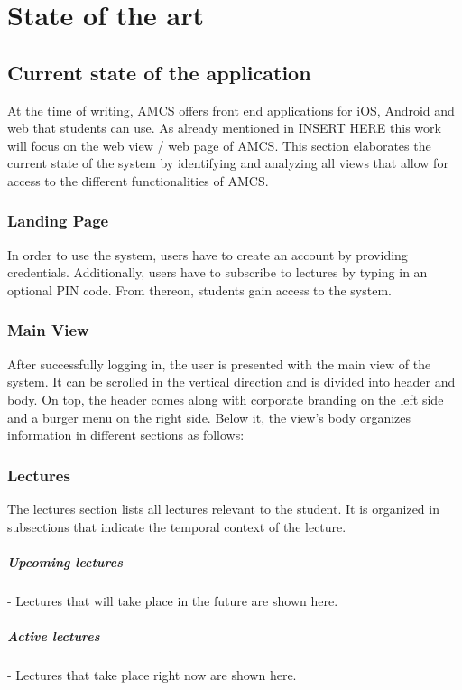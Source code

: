 \chapter{State of the art}
\section{Current state of the application}
At the time of writing, AMCS offers front end applications for iOS, Android and web that students can use. As already mentioned in \todo INSERT HERE this work will focus on the web view / web page of AMCS.
This section elaborates the current state of the system by identifying and analyzing all views that allow for access to the different functionalities of AMCS. 


\subsection{Landing Page}
In order to use the system, users have to create an account by providing credentials. Additionally, users have to subscribe to lectures by typing in an optional PIN code. From thereon, students gain access to the system. 
\todogrf
 
\subsection{Main View}
After successfully logging in, the user is presented with the main view of the system.
It can be scrolled in the vertical direction and is divided into header and body. On top, the header comes along with corporate branding on the left side and a burger menu on the right side. Below it, the view's body organizes information in different sections as follows:

\todogrf

\subsection{Lectures}

The lectures section lists all lectures relevant to the student. It is organized in subsections that indicate the temporal context of the lecture.

\paragraph{Upcoming lectures} - Lectures that will take place in the future are shown here.
\paragraph{Active lectures} - Lectures that take place right now are shown here.
